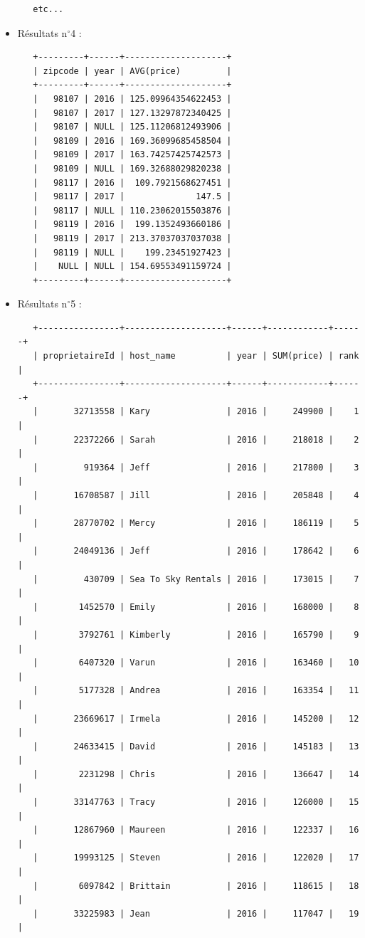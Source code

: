 \documentclass[11pt, a4paper]{article}
\begin{document}
\begin{itemize}[label=\textbullet]
\begin{lstlisting}
   etc...
   \end{lstlisting}
   \item Résultats n$^\circ$4 :
   \begin{lstlisting}
   +---------+------+--------------------+
   | zipcode | year | AVG(price)         |
   +---------+------+--------------------+
   |   98107 | 2016 | 125.09964354622453 |
   |   98107 | 2017 | 127.13297872340425 |
   |   98107 | NULL | 125.11206812493906 |
   |   98109 | 2016 | 169.36099685458504 |
   |   98109 | 2017 | 163.74257425742573 |
   |   98109 | NULL | 169.32688029820238 |
   |   98117 | 2016 |  109.7921568627451 |
   |   98117 | 2017 |              147.5 |
   |   98117 | NULL | 110.23062015503876 |
   |   98119 | 2016 |  199.1352493660186 |
   |   98119 | 2017 | 213.37037037037038 |
   |   98119 | NULL |    199.23451927423 |
   |    NULL | NULL | 154.69553491159724 |
   +---------+------+--------------------+
   \end{lstlisting}
   \item Résultats n$^\circ$5 :
   \begin{lstlisting}
   +----------------+--------------------+------+------------+------+
   | proprietaireId | host_name          | year | SUM(price) | rank |
   +----------------+--------------------+------+------------+------+
   |       32713558 | Kary               | 2016 |     249900 |    1 |
   |       22372266 | Sarah              | 2016 |     218018 |    2 |
   |         919364 | Jeff               | 2016 |     217800 |    3 |
   |       16708587 | Jill               | 2016 |     205848 |    4 |
   |       28770702 | Mercy              | 2016 |     186119 |    5 |
   |       24049136 | Jeff               | 2016 |     178642 |    6 |
   |         430709 | Sea To Sky Rentals | 2016 |     173015 |    7 |
   |        1452570 | Emily              | 2016 |     168000 |    8 |
   |        3792761 | Kimberly           | 2016 |     165790 |    9 |
   |        6407320 | Varun              | 2016 |     163460 |   10 |
   |        5177328 | Andrea             | 2016 |     163354 |   11 |
   |       23669617 | Irmela             | 2016 |     145200 |   12 |
   |       24633415 | David              | 2016 |     145183 |   13 |
   |        2231298 | Chris              | 2016 |     136647 |   14 |
   |       33147763 | Tracy              | 2016 |     126000 |   15 |
   |       12867960 | Maureen            | 2016 |     122337 |   16 |
   |       19993125 | Steven             | 2016 |     122020 |   17 |
   |        6097842 | Brittain           | 2016 |     118615 |   18 |
   |       33225983 | Jean               | 2016 |     117047 |   19 |

\end{lstlisting}
\end{itemize}
\end{document}
